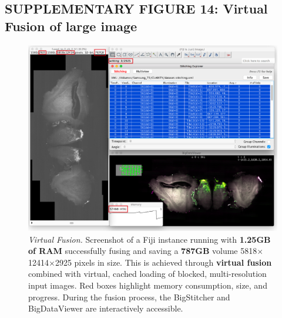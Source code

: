 \documentclass[]{spie}  %
\begin{document}
\subsection*{SUPPLEMENTARY FIGURE 14: Virtual Fusion of large image}
\vspace{1mm}
\begin{figure}[h!]
\includegraphics[width=\textwidth]{fig-fusion-screenshot.png}
\vspace{-2.0mm}
\caption{\hspace{-0.5mm} \emph{Virtual Fusion.} Screenshot of a Fiji instance running with \textbf{1.25GB of RAM} successfully fusing and saving a \textbf{787GB} volume 5818$\times$12414$\times$2925 pixels in size. This is achieved through \textbf{virtual fusion} combined with virtual, cached loading of blocked, multi-resolution input images. Red boxes highlight memory consumption, size, and progress. During the fusion process, the BigStitcher and BigDataViewer are interactively accessible.
}
\label{fig:sup-fig-fusion}
\end{figure}

\pagebreak
\end{document}
